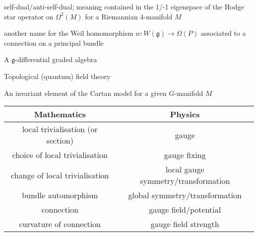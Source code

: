 
\newcommand{\term}[2]{\item[{\ \parbox{4.58cm}{#1}}]{#2}}
\begin{list}{}{ \setlength{\leftmargin}{4.8cm}
                \setlength{\labelwidth}{4.8cm}}

\term{SD/ASD}{self-dual/anti-self-dual; meaning contained in the 1/-1 eigenspace
of the Hodge star operator on $\Omega^2(M)$ for a Riemannian 4-manifold $M$}


\term{characteristic\\ homomorphism}{another name for the Weil homomorphism
$w:W(\mathfrak{g})\to \Omega(P)$ associated to a connection on a principal
bundle}

\term{$\mathfrak{g}$-dga}{A $\mathfrak{g}$-differential graded algebra}

\term{TQFT/TFT}{Topological (quantum) field theory}

\term{equivariant form}{An invariant element of the Cartan model for a given
$G$-manifold  $M$}


\end{list}
\begin{table}[hb]
	\centering
	\begin{tabular}{c | c }
		Mathematics & Physics \\
		\hline
		local trivialisation (or section) & gauge \\
		choice of local trivialisation & gauge fixing \\
		change of local trivialisation & local gauge symmetry/transformation\\
		bundle automorphism & global symmetry/transformation\\
		connection & gauge field/potential \\
		curvature of connection & gauge field strength \\
    \end{tabular}
	\label{tab:phys_terminology}
\end{table}


